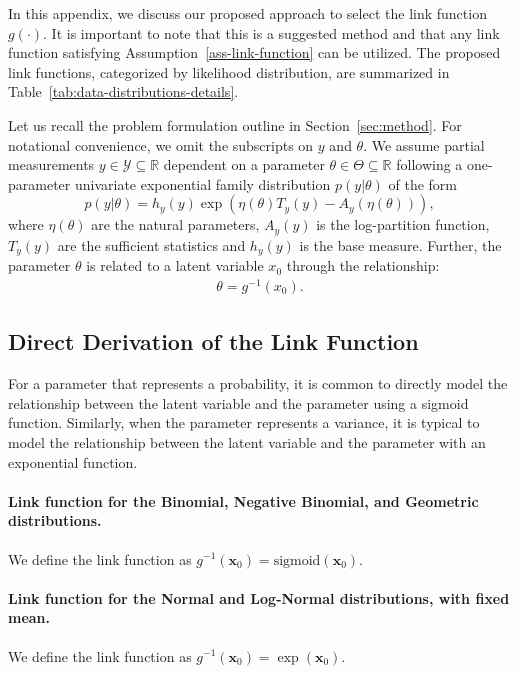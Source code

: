 In this appendix, we discuss our proposed approach to select the link function $g(\cdot)$. It is important to note that this is a suggested method and that any link function satisfying Assumption~\ref{ass-link-function} can be utilized. The proposed link functions, categorized by likelihood distribution, are summarized in Table~\ref{tab:data-distributions-details}.

Let us recall the problem formulation outline in Section~\ref{sec:method}. For notational convenience, we omit the subscripts on $y$ and $\theta$. We assume partial measurements $y\in \mathcal{Y} \subseteq \mathbb{R}$ dependent on a parameter $\theta \in \Theta \subseteq \mathbb{R}$ following a one-parameter univariate exponential family distribution $p(y|\theta)$ of the form
\begin{equation*}
p(y \vert {\theta}) = h_y(y) \exp\left( {\eta}({\theta}) {T}_y(y) - A_y(\eta({\theta})) \right),
\end{equation*}
where ${\eta}({\theta})$ are the natural parameters, $A_y(y)$ is the log-partition function, ${T}_y(y)$ are the sufficient statistics and $h_y(y)$ is the base measure. 
Further, the parameter $\theta$ is related to a latent variable $x_0$ through the relationship: 
\begin{align*}
    \theta = g^{-1}(x_0).
\end{align*}

\subsection{Direct Derivation of the Link Function}

For a parameter that represents a probability, it is common to directly model the relationship between the latent variable and the parameter using a sigmoid function. 
Similarly, when the parameter represents a variance, it is typical to model the relationship between the latent variable and the parameter with an exponential function.

\paragraph{Link function for the Binomial, Negative Binomial, and Geometric distributions.} We define the link function as $g^{-1}(\mathbf{x}_0) = \text{sigmoid}(\mathbf{x}_0)$.

\paragraph{Link function for the Normal and Log-Normal distributions, with fixed mean.} We define the link function as $g^{-1}(\mathbf{x}_0) = \exp(\mathbf{x}_0)$.

